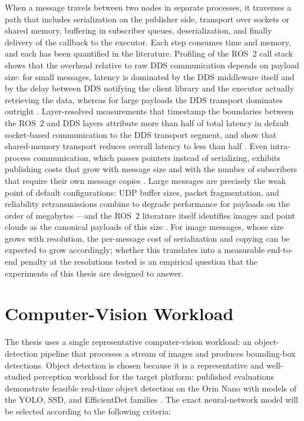 When a message travels between two nodes in separate processes, it
traverses a path that includes serialization on the publisher side,
transport over sockets or shared memory, buffering in subscriber queues,
deserialization, and finally delivery of the callback to the executor.
Each step consumes time and memory, and each has been quantified in the
literature. Profiling of the ROS~2 call stack shows that the overhead
relative to raw DDS communication depends on payload size: for small
messages, latency is dominated by the DDS middleware itself and by the
delay between DDS notifying the client library and the executor actually
retrieving the data, whereas for large payloads the DDS transport
dominates outright \cite{kronauer2021}. Layer-resolved measurements that
timestamp the boundaries between the ROS~2 and DDS layers attribute more
than half of total latency in default socket-based communication to the
DDS transport segment, and show that shared-memory transport reduces
overall latency to less than half \cite{kamiya2025}. Even intra-process
communication, which passes pointers instead of serializing, exhibits
publishing costs that grow with message size and with the number of
subscribers that require their own message copies \cite{luo2025}.
Large messages are precisely the weak point of default configurations:
UDP buffer sizes, packet fragmentation, and reliability retransmissions
combine to degrade performance for payloads on the order of megabytes
\cite{macenski2022, kronauer2021}---and the ROS~2 literature itself
identifies images and point clouds as the canonical payloads of this size
\cite{macenski2022, macenski2023}. For image messages, whose size grows
with resolution, the per-message cost of serialization and copying can be
expected to grow accordingly; whether this translates into a measurable
end-to-end penalty at the resolutions tested is an empirical question that
the experiments of this thesis are designed to answer.

\section{Computer-Vision Workload}
\label{sec:workload}

The thesis uses a single representative computer-vision workload: an
object-detection pipeline that processes a stream of images and produces
bounding-box detections. Object detection is chosen because it is a
representative and well-studied perception workload for the target
platform: published evaluations demonstrate feasible real-time object
detection on the Orin Nano with models of the YOLO, SSD, and EfficientDet
families \cite{scalcon2024, alqahtani2026, szegedi2026, zequn2026}. The
exact neural-network model will be selected according to the following
criteria:

